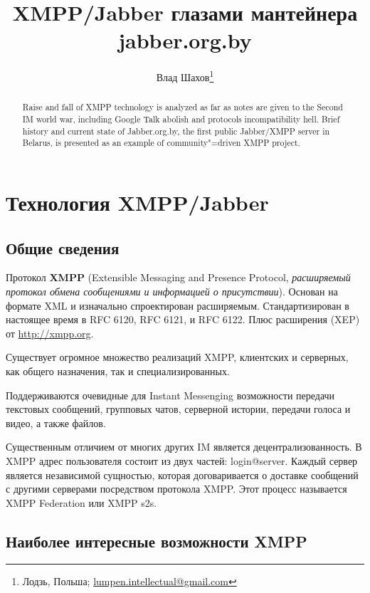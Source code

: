 \documentclass[10pt, a5paper]{article}
\begin{document}
\title{XMPP/Jabber глазами мантейнера jabber.org.by}%

\author{Влад Шахов\footnote{Лодзь, Польша; \url{lumpen.intellectual@gmail.com}}}
\maketitle

\begin{abstract}
Raise and fall of XMPP technology is analyzed as far as notes are given to the Second IM world war, including Google Talk abolish and protocols incompatibility hell. Brief history and current state of Jabber.org.by, the first public  Jabber/XMPP server in Belarus, is presented as an example of community"=driven XMPP project. 
\end{abstract}

\section*{Технология XMPP/Jabber}

\subsection*{Общие сведения}

Протокол \textbf{XMPP} (Extensible Messaging and Presence Protocol, \emph{расширяемый протокол обмена сообщениями и информацией о присутствии}). Основан на формате XML и изначально спроектирован расширяемым. Стандартизирован в настоящее время в RFC 6120, RFC 6121, и RFC 6122. Плюс расширения (XEP) от \url{http://xmpp.org}.

Существует огромное множество реализаций XMPP, клиентских и серверных, как общего назначения, так и специализированных.

Поддерживаются очевидные для Instant Messenging возможности передачи текстовых сообщений, групповых чатов, серверной истории, передачи голоса и видео, а также файлов.

Существенным отличием от многих других IM является децентрализованность. В XMPP адрес пользователя состоит из двух частей: login@server. Каждый сервер является независимой сущностью, которая договаривается о доставке сообщений с другими серверами посредством протокола XMPP. Этот процесс называется XMPP Federation или XMPP s2s.

\subsection*{Наиболее интересные возможности XMPP}
\end{document}
